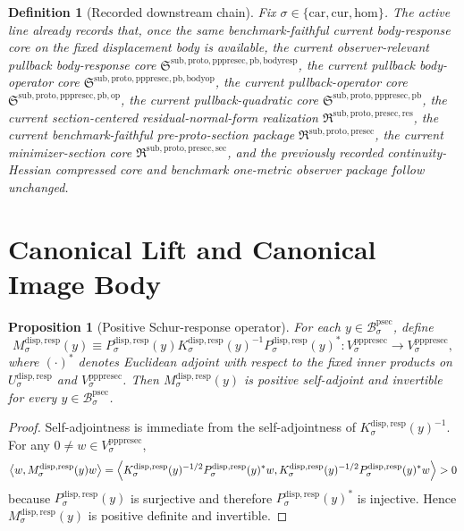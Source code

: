\documentclass[11pt]{article}
\newcommand{\Car}{\mathrm{car}}
\newcommand{\Cur}{\mathrm{cur}}
\newcommand{\Hom}{\mathrm{hom}}
\newcommand{\ProtoSectionBody}[1]{\mathcal B_{#1}^{\mathrm{psec}}}
\newcommand{\PrePreProtoSectionPullbackCore}{\mathfrak S^{\mathrm{sub,proto,pppresec,pb}}}
\newcommand{\PrePreProtoSectionVertical}[1]{V_{#1}^{\mathrm{pppresec}}}
\newcommand{\PullbackOperatorCore}{\mathfrak S^{\mathrm{sub,proto,pppresec,pb,op}}}
\newcommand{\PullbackBodyOperatorCore}{\mathfrak S^{\mathrm{sub,proto,pppresec,pb,bodyop}}}
\newcommand{\PullbackBodyResponseCore}{\mathfrak S^{\mathrm{sub,proto,pppresec,pb,bodyresp}}}
\newcommand{\PreProtoSectionResidualPackage}{\mathfrak R^{\mathrm{sub,proto,presec,res}}}
\newcommand{\PreProtoSectionPackage}{\mathfrak R^{\mathrm{sub,proto,presec}}}
\newcommand{\PreProtoSectionMinSectionCore}{\mathfrak R^{\mathrm{sub,proto,presec,sec}}}
\newcommand{\SubstrateCarrier}[1]{U_{#1}^{\mathrm{disp,resp}}}
\newcommand{\SubstrateProjection}[1]{P_{#1}^{\mathrm{disp,resp}}}
\newcommand{\SubstrateOperator}[1]{K_{#1}^{\mathrm{disp,resp}}}
\newcommand{\SchurResponse}[1]{M_{#1}^{\mathrm{disp,resp}}}
\newtheorem{definition}{Definition}
\newtheorem{proposition}{Proposition}
\begin{document}
\begin{definition}[Recorded downstream chain]
\label{def:downstream}
Fix \(\sigma\in\{\Car,\Cur,\Hom\}\). The active line already records that, once the same benchmark-faithful current body-response core on the fixed displacement body is available, the current observer-relevant pullback body-response core \(\PullbackBodyResponseCore\), the current pullback body-operator core \(\PullbackBodyOperatorCore\), the current pullback-operator core \(\PullbackOperatorCore\), the current pullback-quadratic core \(\PrePreProtoSectionPullbackCore\), the current section-centered residual-normal-form realization \(\PreProtoSectionResidualPackage\), the current benchmark-faithful pre-proto-section package \(\PreProtoSectionPackage\), the current minimizer-section core \(\PreProtoSectionMinSectionCore\), and the previously recorded continuity-Hessian compressed core and benchmark one-metric observer package follow unchanged.
\end{definition}

\section{Canonical Lift and Canonical Image Body}

\begin{proposition}[Positive Schur-response operator]
\label{prop:schur}
For each \(y\in\ProtoSectionBody{\sigma}\), define
\[
\SchurResponse{\sigma}(y)
\equiv
\SubstrateProjection{\sigma}(y)
\SubstrateOperator{\sigma}(y)^{-1}
\SubstrateProjection{\sigma}(y)^*:
\PrePreProtoSectionVertical{\sigma}\to\PrePreProtoSectionVertical{\sigma},
\]
where \((\cdot)^*\) denotes Euclidean adjoint with respect to the fixed inner products on \(\SubstrateCarrier{\sigma}\) and \(\PrePreProtoSectionVertical{\sigma}\). Then \(\SchurResponse{\sigma}(y)\) is positive self-adjoint and invertible for every \(y\in\ProtoSectionBody{\sigma}\).
\end{proposition}

\begin{proof}
Self-adjointness is immediate from the self-adjointness of \(\SubstrateOperator{\sigma}(y)^{-1}\). For any \(0\neq w\in\PrePreProtoSectionVertical{\sigma}\),
\[
\ev{w,\SchurResponse{\sigma}(y)w}
=
\ev{
\SubstrateOperator{\sigma}(y)^{-1/2}\SubstrateProjection{\sigma}(y)^*w,
\SubstrateOperator{\sigma}(y)^{-1/2}\SubstrateProjection{\sigma}(y)^*w
}
>0
\]
because \(\SubstrateProjection{\sigma}(y)\) is surjective and therefore \(\SubstrateProjection{\sigma}(y)^*\) is injective. Hence \(\SchurResponse{\sigma}(y)\) is positive definite and invertible.
\end{proof}
\end{document}
